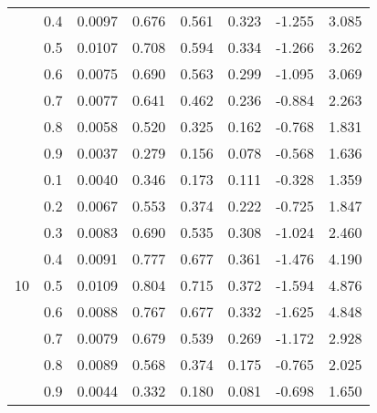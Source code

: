 \documentclass[11pt,a4paper]{report}
\begin{document}
\begin{longtable}{ | c | c || c | c | c | c | c | c | }
 & 0.4 & 0.0097 & 0.676 & 0.561 & 0.323 & -1.255 & 3.085 \\
 & 0.5 & 0.0107 & 0.708 & 0.594 & 0.334 & -1.266 & 3.262 \\
 & 0.6 & 0.0075 & 0.690 & 0.563 & 0.299 & -1.095 & 3.069 \\
 & 0.7 & 0.0077 & 0.641 & 0.462 & 0.236 & -0.884 & 2.263 \\
 & 0.8 & 0.0058 & 0.520 & 0.325 & 0.162 & -0.768 & 1.831 \\
 & 0.9 & 0.0037 & 0.279 & 0.156 & 0.078 & -0.568 & 1.636 \\
 \hline
\multirow{9}{*}{10} & 0.1 & 0.0040 & 0.346 & 0.173 & 0.111 & -0.328 & 1.359 \\
 & 0.2 & 0.0067 & 0.553 & 0.374 & 0.222 & -0.725 & 1.847 \\
 & 0.3 & 0.0083 & 0.690 & 0.535 & 0.308 & -1.024 & 2.460 \\
 & 0.4 & 0.0091 & 0.777 & 0.677 & 0.361 & -1.476 & 4.190 \\
 & 0.5 & 0.0109 & 0.804 & 0.715 & 0.372 & -1.594 & 4.876 \\
 & 0.6 & 0.0088 & 0.767 & 0.677 & 0.332 & -1.625 & 4.848 \\
 & 0.7 & 0.0079 & 0.679 & 0.539 & 0.269 & -1.172 & 2.928 \\
 & 0.8 & 0.0089 & 0.568 & 0.374 & 0.175 & -0.765 & 2.025 \\
 & 0.9 & 0.0044 & 0.332 & 0.180 & 0.081 & -0.698 & 1.650 \\
 \hline
\hline
\end{longtable}
\end{document}
